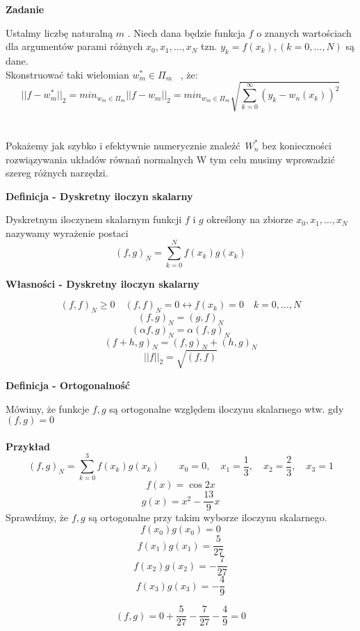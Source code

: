 \documentclass[polish]{kbk}
\begin{document}
\begin{center}
\textbf{Zadanie}
\end{center}
Ustalmy liczbę naturalną  \(m\) . Niech dana będzie funkcja \(f\) o znanych wartościach dla argumentów parami różnych \(x_0, x_1, ... , x_N\) tzn. 
 \(y_k = f(x_k), (k =0,...,N) \) są dane.\\
Skonstruować taki wielomian \(   w^{*}_m \in \Pi_{m}  \) ~\cite{znaczek}, że:
$$ || f -  w^{*}_m ||_2 = min_{ w_m \in \Pi_m } || f - w_m||_2 = min_{ w_m \in \Pi_m } \sqrt{  \sum_{k=0}^{\infty} (y_k - w_n (x_k))^2 }$$
\\
\\
Pokażemy jak szybko i efektywnie numerycznie znaleźć \(W^{*}_n \) bez konieczności rozwiązywania układów równań normalnych
W tym celu musimy wprowadzić szereg różnych narzędzi.
\\
\begin{center}
\textbf{Definicja - Dyskretny iloczyn skalarny}
\end{center}

Dyskretnym iloczynem skalarnym funkcji \(f\) i \(g\) określony na zbiorze  \(x_0, x_1, ... , x_N\) nazywamy wyrażenie postaci
$$ (f,g)_N =  \sum_{k=0}^{N} f(x_k)  g(x_k) $$


\begin{center}
\textbf{Własności - Dyskretny iloczyn skalarny}
\end{center}
$$ (f,f)_N \geq 0 \quad (f,f)_N = 0  \leftrightarrow  f(x_k) = 0  \quad k = 0,...,N$$
$$ (f,g)_N = (g,f)_N $$
$$ (\alpha f,g)_N = \alpha (f,g)_N $$
$$ (f+h, g)_N = (f,g)_N + (h,g)_N $$
$$ ||f||_2 = \sqrt { (f,f) } $$ 

\begin{center}
\textbf{Definicja - Ortogonalność}
\end{center}
Mówimy, że funkcje \(f,g\) są ortogonalne względem iloczynu skalarnego wtw. gdy \( (f,g) = 0 \) \\ \\
\textbf{Przykład} \\
$$ (f,g)_N = \sum_{k=0}^{3} f(x_k)g(x_k) \quad  \quad x_0 = 0,  \quad x_1 = \frac{1}{3},  \quad x_2 = \frac{2}{3},  \quad x_3 = 1 $$
$$ f(x) = \cos{2x} $$
$$ g(x) = x^2 - \frac{13}{9}x $$
Sprawdźmy, że \(f,g\) są ortogonalne przy takim wyborze iloczynu skalarnego.
$$ f(x_0)g(x_0) = 0 $$
$$ f(x_1)g(x_1) = \frac{5}{27} $$
$$ f(x_2)g(x_2) = - \frac{7}{27} $$
$$ f(x_3)g(x_3) = - \frac{4}{9} $$

$$(f,g) = 0 + \frac{5}{27}  - \frac{7}{27} - \frac{4}{9} = 0 $$
\end{document}
